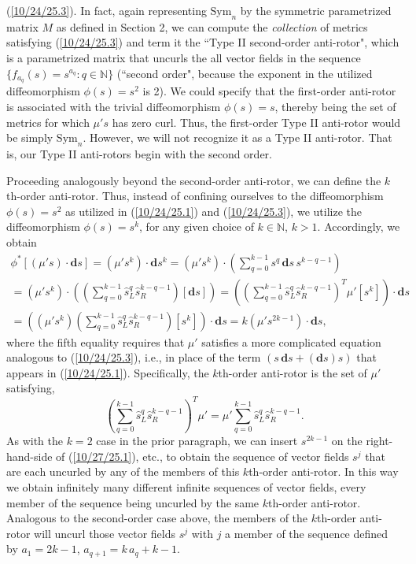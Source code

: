 \documentclass{amsart}
\theoremstyle{definition}
\numberwithin{theorem}{section}
\numberwithin{equation}{section}
\begin{document}
(\ref{10/24/25.3}).  In fact, again representing $\text{Sym}_n$ by the symmetric parametrized matrix $M$ as defined in Section 2, we can compute the {\it collection} of metrics satisfying (\ref{10/24/25.3}) and term  it the ``Type II second-order anti-rotor", which is a parametrized matrix that uncurls the all vector fields in the sequence $\{f_{a_q}(s)=s^{a_q}:q\in\mathbb{N}\}$ (``second order", because the exponent in the utilized diffeomorphism $\phi(s)=s^2$ is 2).  We could specify that the first-order anti-rotor is associated with the trivial diffeomorphism $\phi(s)=s$, thereby being the set of metrics for which $\mu' s$ has zero curl.  Thus, the first-order Type II anti-rotor would be simply $\text{Sym}_n$.  However, we will not recognize it as a Type II anti-rotor.  That is, our Type II anti-rotors begin with the second order.

Proceeding analogously beyond the second-order anti-rotor, we can define the $k$th-order anti-rotor.  Thus, instead of confining ourselves to the diffeomorphism $\phi(s)=s^2$ as utilized in (\ref{10/24/25.1}) and (\ref{10/24/25.3}), we utilize the diffeomorphism $\phi(s)=s^k$, for any given choice of $k\in\mathbb{N}$, $k>1$.   Accordingly, we obtain
\begin{multline}\label{10/27/25.1} \phi^*[(\mu' s)\cdot \mathbf{d}s] = (\mu' s^k)\cdot \mathbf{d}s^k =  (\mu' s^k)\cdot \left(\sum_{q=0}^{k-1} s^q\, \mathbf{d}s\, s^{k-q-1}\right) \\ = (\mu' s^k)\cdot \left(\left(\sum_{q=0}^{k-1} \hat{s}_L^q\hat{s}_R^{k-q-1}\right) [\mathbf{d}s]\right) =\left(\left(\sum_{q=0}^{k-1} \hat{s}_L^q\hat{s}_R^{k-q-1}\right)^T \mu' [s^k]\right)\cdot  \mathbf{d}s \\ = 
\left((\mu' s^k)\left(\sum_{q=0}^{k-1} \hat{s}_L^q\hat{s}_R^{k-q-1}\right)[s^k]\right)\cdot \mathbf{d}s = k(\mu' s^{2k-1})\cdot \mathbf{d}s,\end{multline} where the fifth equality requires that $\mu'$ satisfies a more complicated equation analogous to (\ref{10/24/25.3}), i.e.,  in place of the term $(s\,\mathbf{d}s + (\mathbf{d}s)s)$ that appears in (\ref{10/24/25.1}).  Specifically, the $k$th-order anti-rotor is the set of $\mu'$ satisfying, \begin{equation}\label{10/29/25.5} \left(\sum_{q=0}^{k-1} \hat{s}_L^q\hat{s}_R^{k-q-1}\right)^T \mu' = 
\mu' \sum_{q=0}^{k-1} \hat{s}_L^q\hat{s}_R^{k-q-1}.\end{equation}
As with the $k=2$ case in the prior paragraph, we can insert $s^{2k-1}$ on the right-hand-side of (\ref{10/27/25.1}), etc., to obtain the sequence of vector fields $s^j$ that are each uncurled by any of the members of this $k$th-order anti-rotor.  In this way we obtain infinitely many different infinite sequences of vector fields, every member of the sequence being uncurled by the same $k$th-order anti-rotor.  Analogous to the second-order case above, the members of the $k$th-order anti-rotor will uncurl those vector fields $s^j$ with $j$ a member of the sequence defined by $a_1=2k-1$, $a_{q+1} = k\, a_q + k-1$.   
 
\end{document}
